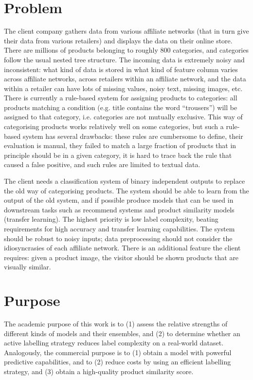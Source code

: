 \section{Problem}

The client company gathers data from various affiliate networks (that in turn give their data from various retailers) and displays the data on their online store.
There are millions of products belonging to roughly 800 categories, and categories follow the usual nested tree structure.
The incoming data is extremely noisy and inconsistent: what kind of data is stored in what kind of feature column varies across affiliate networks, across retailers within an affiliate network, and the data within a retailer can have lots of missing values, noisy text, missing images, etc.
There is currently a rule-based system for assigning products to categories: all products matching a condition (e.g. title contains the word ``trousers'') will be assigned to that category, i.e. categories are not mutually exclusive.
This way of categorising products works relatively well on some categories, but such a rule-based system has several drawbacks: these rules are cumbersome to define, their evaluation is manual, they failed to match a large fraction of products that in principle should be in a given category, it is hard to trace back the rule that caused a false positive, and such rules are limited to textual data.

The client needs a classification system of binary independent outputs to replace the old way of categorising products.
The system should be able to learn from the output of the old system, and if possible produce models that can be used in downstream tasks such as recommend systems and product similarity models (transfer learning).
The highest priority is low label complexity, beating requirements for high accuracy and transfer learning capabilities.
The system should be robust to  noisy inputs; data preprocessing should not consider the idiosyncrasies of each affiliate network.
There is an additional feature the client requires: given a product image, the visitor should be shown products that are visually similar.

\section{Purpose}

The academic purpose of this work is to (1) assess the relative strengths of different kinds of models and their ensembles, and (2) to determine whether an active labelling strategy reduces label complexity on a real-world dataset. Analogously, the commercial purpose is to (1) obtain a model with powerful predictive capabilities, and to (2) reduce costs by using an efficient labelling strategy, and (3) obtain a high-quality product similarity score.

